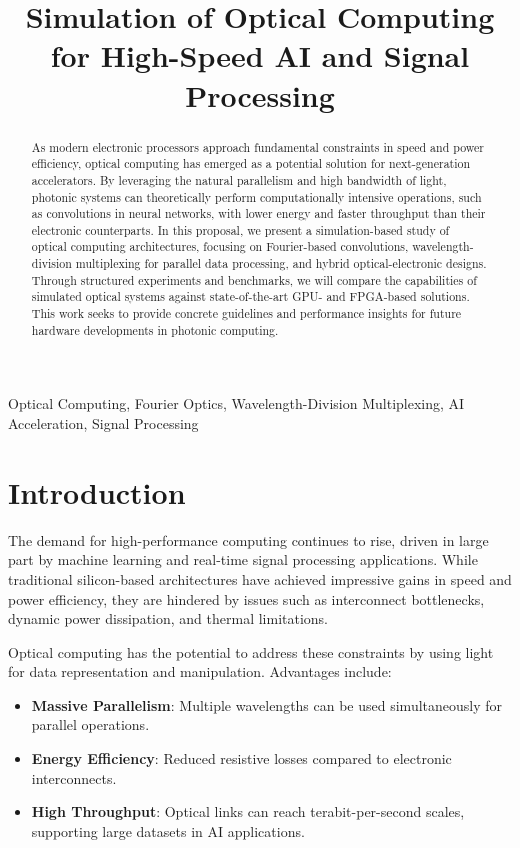 \documentclass[conference]{IEEEtran}
\title{\textbf{Simulation of Optical Computing for High-Speed AI and Signal Processing}}
\author{
  \IEEEauthorblockN{Santiago Sosa \& Marc DeCarlo}
  \IEEEauthorblockA{Department of Electrical and Computer Engineering\\ Drexel University\\
  Emails: {ss5427@drexel.edu, mad534@drexel.edu} }
}
\begin{document}
\maketitle

\begin{abstract}
As modern electronic processors approach fundamental constraints in speed and power efficiency, optical computing has emerged as a potential solution for next-generation accelerators. By leveraging the natural parallelism and high bandwidth of light, photonic systems can theoretically perform computationally intensive operations, such as convolutions in neural networks, with lower energy and faster throughput than their electronic counterparts. In this proposal, we present a simulation-based study of optical computing architectures, focusing on Fourier-based convolutions, wavelength-division multiplexing for parallel data processing, and hybrid optical-electronic designs. Through structured experiments and benchmarks, we will compare the capabilities of simulated optical systems against state-of-the-art GPU- and FPGA-based solutions. This work seeks to provide concrete guidelines and performance insights for future hardware developments in photonic computing.
\end{abstract}

\begin{IEEEkeywords}
Optical Computing, Fourier Optics, Wavelength-Division Multiplexing, AI Acceleration, Signal Processing
\end{IEEEkeywords}

\section{Introduction}
The demand for high-performance computing continues to rise, driven in large part by machine learning and real-time signal processing applications. While traditional silicon-based architectures have achieved impressive gains in speed and power efficiency, they are hindered by issues such as interconnect bottlenecks, dynamic power dissipation, and thermal limitations.

Optical computing has the potential to address these constraints by using light for data representation and manipulation. Advantages include:
\begin{itemize}
    \item \textbf{Massive Parallelism}: Multiple wavelengths can be used simultaneously for parallel operations.
    \item \textbf{Energy Efficiency}: Reduced resistive losses compared to electronic interconnects.
    \item \textbf{High Throughput}: Optical links can reach terabit-per-second scales, supporting large datasets in AI applications.
\end{itemize}
\end{document}
